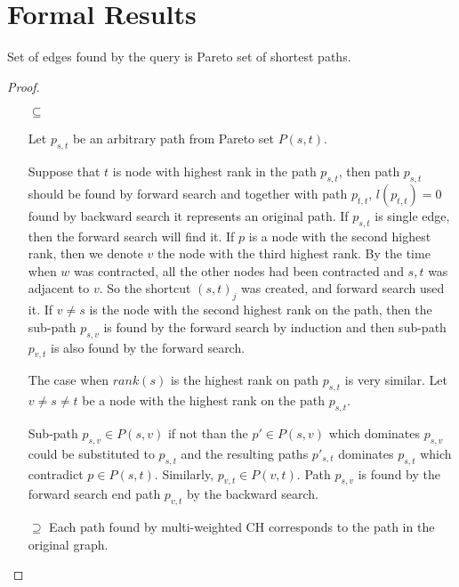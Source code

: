 

\section{Formal Results}
\label{secFormalResults}

\begin{lemma}
Set of edges found by the query is Pareto set of shortest paths.
\end{lemma}
\begin{proof}
\begin{itemize}
\item[$\subseteq$] 

Let $p_{s,t}$ be an arbitrary path from Pareto set $P(s,t)$. 

Suppose that $t$ is node with highest rank in the path $p_{s,t}$, 
then path $p_{s,t}$ should be found by forward search
and together with path $p_{t,t}$, $l(p_{t,t})=0$ 
found by backward search it represents an original path.
If $p_{s,t}$ is single edge, then the forward search will find it.
If $p$ is a node with the second highest rank, then we denote $v$ the
node with the third highest rank. 
By the time when $w$ was contracted, all the other nodes had been contracted
and $s,t$ was adjacent to $v$. So the shortcut $(s,t)_j$ was created, and forward search used it.
If $v \ne s$ is the node with the second highest rank on the path,
then the sub-path $p_{s,v}$ is found by the forward search by induction and
then sub-path $p_{v,t}$ is also found by the forward search.

The case when $rank(s)$ is the highest rank on path $p_{s,t}$ is very similar. 
Let $v \ne s \ne t$ be a node with the highest rank on the path $p_{s,t}$. 

Sub-path $p_{s,v} \in P(s,v)$ if not than the $p' \in P(s,v)$ which dominates $p_{s,v}$ could be substituted
to $p_{s,t}$ and the resulting paths $p'_{s,t}$ dominates $p_{s,t}$ which contradict
$p \in P(s,t)$.
Similarly, $p_{v,t} \in P(v,t) $. Path $p_{s,v}$ is found by the forward search end path
$p_{v,t}$ by the backward search.

\item[$\supseteq$] 
Each path found by multi-weighted CH corresponds to the path in the original graph. 

\end{itemize}
\end{proof}

